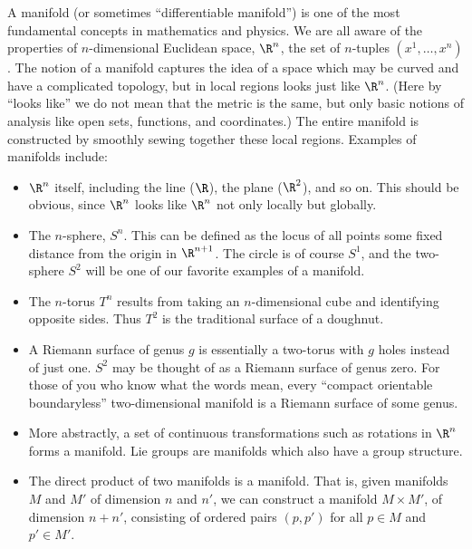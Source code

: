 A manifold (or sometimes ``differentiable manifold'') is one of the
most fundamental concepts in mathematics and physics.  We are all
aware of the properties of $n$-dimensional Euclidean space, $\R^n$,
the set of $n$-tuples $(x^1,\ldots,x^n)$.
The notion of a manifold captures the idea of a space which may be
curved and have a complicated topology, but in local regions looks
just like $\R^n$.  (Here by ``looks like'' we do not mean that the
metric is the same, but only basic notions of analysis like open sets,
functions, and coordinates.)  The entire manifold is constructed by
smoothly sewing together these local regions.  Examples of manifolds
include:
\begin{itemize}
  \item $\R^n$ itself, including the line ($\R$), the plane
  ($\R^2$), and so on.  This should be obvious, since $\R^n$ looks 
  like $\R^n$ not only locally but globally.
  \item The $n$-sphere, $S^n$.  This can be defined as the locus
  of all points some fixed distance from the origin in $\R^{n+1}$.
  The circle is of course $S^1$, and the two-sphere $S^2$ will be one
  of our favorite examples of a manifold.


  \item The $n$-torus $T^n$ results from taking an 
  $n$-dimensional cube and identifying opposite sides.  Thus $T^2$ is
  the traditional surface of a doughnut.

\begin{figure}[h]
  \centerline{
  }
\end{figure}

  \item A Riemann surface of genus $g$ is essentially a
  two-torus with $g$ holes instead of just one.  $S^2$ may be thought
  of as a Riemann surface of genus zero.  For those of you who know 
  what the words mean, every ``compact orientable boundaryless''
  two-dimensional manifold is a Riemann surface of some genus.

\begin{figure}[h]
  \centerline{
  }
\end{figure}

  \item More abstractly, a set of continuous transformations
  such as rotations in $\R^n$ forms a manifold.  Lie groups are manifolds
  which also have a group structure.

  \item The direct product of two manifolds is a manifold.
  That is, given manifolds $M$ and $M'$ of dimension $n$ and $n'$, we can 
  construct a manifold $M\times M'$, of dimension $n+n'$, consisting of 
  ordered pairs $(p,p')$ for all $p\in M$ and $p'\in M'$.

\end{itemize}

